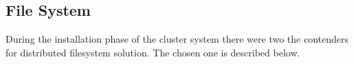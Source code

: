 \documentclass[twoside,a4paper,12pt,english]{inac19}
\begin{document}





\subsection{File System}

During the installation phase of the cluster system\cite{cluster17} there were two the contenders for
distributed filesystem solution. The chosen one is described below.
\end{document}

